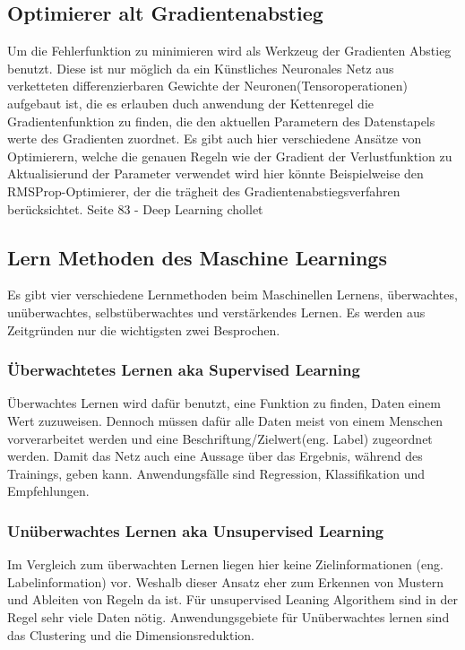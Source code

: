 \subsection{Optimierer alt Gradientenabstieg}
Um die Fehlerfunktion zu minimieren wird als Werkzeug der Gradienten Abstieg benutzt. Diese ist nur möglich da ein Künstliches Neuronales Netz aus verketteten differenzierbaren Gewichte der Neuronen(Tensoroperationen) aufgebaut ist, die es erlauben duch anwendung der Kettenregel die Gradientenfunktion zu finden, die den aktuellen Parametern des Datenstapels werte des Gradienten zuordnet. Es gibt auch hier verschiedene Ansätze von Optimierern, welche die genauen Regeln wie der Gradient der Verlustfunktion zu Aktualisierund der Parameter verwendet wird hier könnte Beispielweise den RMSProp-Optimierer, der die trägheit des Gradientenabstiegsverfahren berücksichtet. Seite 83 - Deep Learning chollet

\subsection{Lern Methoden des Maschine Learnings}
Es gibt vier verschiedene Lernmethoden beim Maschinellen Lernens, überwachtes, unüberwachtes, selbstüberwachtes und verstärkendes Lernen. Es werden aus Zeitgründen nur die wichtigsten zwei Besprochen.

\subsubsection{Überwachtetes Lernen aka Supervised Learning}
Überwachtes Lernen wird dafür benutzt, eine Funktion zu finden, Daten einem Wert zuzuweisen. Dennoch müssen dafür alle Daten meist von einem Menschen vorverarbeitet werden und eine Beschriftung/Zielwert(eng. Label) zugeordnet werden. Damit das Netz auch eine Aussage über das Ergebnis, während des Trainings, geben kann. Anwendungsfälle sind Regression, Klassifikation und Empfehlungen.

\subsubsection{Unüberwachtes Lernen aka Unsupervised Learning}
Im Vergleich zum überwachten Lernen liegen hier keine Zielinformationen (eng. Labelinformation) vor. Weshalb dieser Ansatz eher zum Erkennen von Mustern und Ableiten von Regeln da ist. Für unsupervised Leaning Algorithem sind in der Regel sehr viele Daten nötig. Anwendungsgebiete für Unüberwachtes lernen sind das Clustering und die Dimensionsreduktion.

